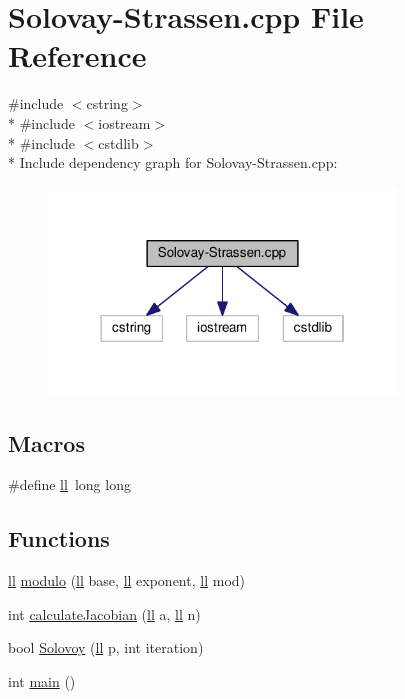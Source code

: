 \hypertarget{Solovay-Strassen_8cpp}{}\section{Solovay-\/\+Strassen.cpp File Reference}
\label{Solovay-Strassen_8cpp}
{\ttfamily \#include $<$cstring$>$}\\*
{\ttfamily \#include $<$iostream$>$}\\*
{\ttfamily \#include $<$cstdlib$>$}\\*
Include dependency graph for Solovay-\/\+Strassen.cpp\+:
\nopagebreak
\begin{figure}[H]
\begin{center}
\leavevmode
\includegraphics[width=262pt]{Solovay-Strassen_8cpp__incl}
\end{center}
\end{figure}
\subsection*{Macros}
\begin{DoxyCompactItemize}
\item 
\#define \hyperlink{Solovay-Strassen_8cpp_ae1d1ec9482079231e898236e2b23c9ba}{ll}~long long
\end{DoxyCompactItemize}
\subsection*{Functions}
\begin{DoxyCompactItemize}
\item 
\hyperlink{Solovay-Strassen_8cpp_ae1d1ec9482079231e898236e2b23c9ba}{ll} \hyperlink{Solovay-Strassen_8cpp_ad815f4d0c344576558f86d0dd549e7f2}{modulo} (\hyperlink{Solovay-Strassen_8cpp_ae1d1ec9482079231e898236e2b23c9ba}{ll} base, \hyperlink{Solovay-Strassen_8cpp_ae1d1ec9482079231e898236e2b23c9ba}{ll} exponent, \hyperlink{Solovay-Strassen_8cpp_ae1d1ec9482079231e898236e2b23c9ba}{ll} mod)
\item 
int \hyperlink{Solovay-Strassen_8cpp_a8cdb5b6678d3f321ad91e68058ac6306}{calculate\+Jacobian} (\hyperlink{Solovay-Strassen_8cpp_ae1d1ec9482079231e898236e2b23c9ba}{ll} a, \hyperlink{Solovay-Strassen_8cpp_ae1d1ec9482079231e898236e2b23c9ba}{ll} n)
\item 
bool \hyperlink{Solovay-Strassen_8cpp_a65b69102e0221bb5cfcb7485dffda0d0}{Solovoy} (\hyperlink{Solovay-Strassen_8cpp_ae1d1ec9482079231e898236e2b23c9ba}{ll} p, int iteration)
\item 
int \hyperlink{Solovay-Strassen_8cpp_ae66f6b31b5ad750f1fe042a706a4e3d4}{main} ()
\end{DoxyCompactItemize}


